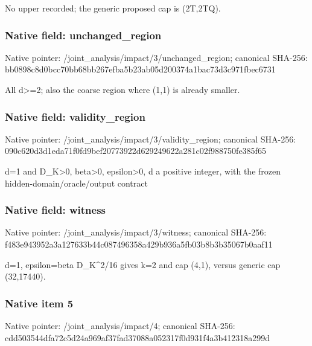 \documentclass[10pt,a4paper]{article}
\begin{document}
\begingroup\raggedright\sloppy No upper recorded;\allowbreak{} the generic proposed cap is (2T,\allowbreak{}2TQ).\par\endgroup

\subsubsection{Native field: unchanged\_\allowbreak{}region}
Native pointer: /joint\_\allowbreak{}analysis/impact/3/unchanged\_\allowbreak{}region; canonical SHA-256: bb0898c8d0bcc70bb68bb267efba5b23ab05d200374a1bac73d3c971fbec6731

\begingroup\raggedright\sloppy All d>=\allowbreak{}2;\allowbreak{} also the coarse region where (1,\allowbreak{}1) is already smaller.\par\endgroup

\subsubsection{Native field: validity\_\allowbreak{}region}
Native pointer: /joint\_\allowbreak{}analysis/impact/3/validity\_\allowbreak{}region; canonical SHA-256: 090c620d3d1eda71f0fd9bef20773922d629249622a281c02f988750fe385f65

\begingroup\raggedright\sloppy d=\allowbreak{}1 and D\_\allowbreak{}K>0,\allowbreak{} beta>0,\allowbreak{} epsilon>0,\allowbreak{} d a positive integer,\allowbreak{} with the frozen hidden-domain/\allowbreak{}oracle/\allowbreak{}output contract\par\endgroup

\subsubsection{Native field: witness}
Native pointer: /joint\_\allowbreak{}analysis/impact/3/witness; canonical SHA-256: f483e943952a3a127633b44c087496358a429b936a5fb03b8b3b35067b0aaf11

\begingroup\raggedright\sloppy d=\allowbreak{}1,\allowbreak{} epsilon=\allowbreak{}beta D\_\allowbreak{}K\textasciicircum{}2/\allowbreak{}16 gives k=\allowbreak{}2 and cap (4,\allowbreak{}1),\allowbreak{} versus generic cap (32,\allowbreak{}17440).\par\endgroup

\subsubsection{Native item 5}
Native pointer: /joint\_\allowbreak{}analysis/impact/4; canonical SHA-256: cdd503544dfa72c5d24a969af37fad37088a052317f0d931f4a3b412318a299d
\end{document}
